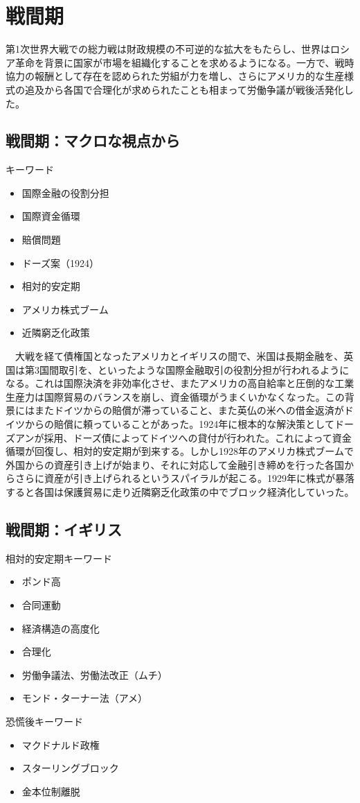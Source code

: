 \documentclass{jsarticle}
\begin{document}
\section{戦間期}
第1次世界大戦での総力戦は財政規模の不可逆的な拡大をもたらし、世界はロシア革命を背景に国家が市場を組織化することを求めるようになる。一方で、戦時協力の報酬として存在を認められた労組が力を増し、さらにアメリカ的な生産様式の追及から各国で合理化が求められたことも相まって労働争議が戦後活発化した。
\subsection{戦間期：マクロな視点から}
キーワード
\begin{itemize}
\item 国際金融の役割分担
\item 国際資金循環
\item 賠償問題
\item ドーズ案（1924）
\item 相対的安定期
\item アメリカ株式ブーム
\item 近隣窮乏化政策
\end{itemize}
　大戦を経て債権国となったアメリカとイギリスの間で、米国は長期金融を、英国は第3国間取引を、といったような国際金融取引の役割分担が行われるようになる。これは国際決済を非効率化させ、またアメリカの高自給率と圧倒的な工業生産力は国際貿易のバランスを崩し、資金循環がうまくいかなくなった。この背景にはまたドイツからの賠償が滞っていること、また英仏の米への借金返済がドイツからの賠償に頼っていることがあった。1924年に根本的な解決策としてドーズアンが採用、ドーズ債によってドイツへの貸付が行われた。これによって資金循環が回復し、相対的安定期が到来する。しかし1928年のアメリカ株式ブームで外国からの資産引き上げが始まり、それに対応して金融引き締めを行った各国からさらに資産が引き上げられるというスパイラルが起こる。1929年に株式が暴落すると各国は保護貿易に走り近隣窮乏化政策の中でブロック経済化していった。

\subsection{戦間期：イギリス}
相対的安定期キーワード
\begin{itemize}
\item ポンド高
\item 合同運動
\item 経済構造の高度化
\item 合理化
\item 労働争議法、労働法改正（ムチ）
\item モンド・ターナー法（アメ）
\end{itemize}
恐慌後キーワード
\begin{itemize}
\item マクドナルド政権
\item スターリングブロック
\item 金本位制離脱
\end{itemize}
\end{document}
